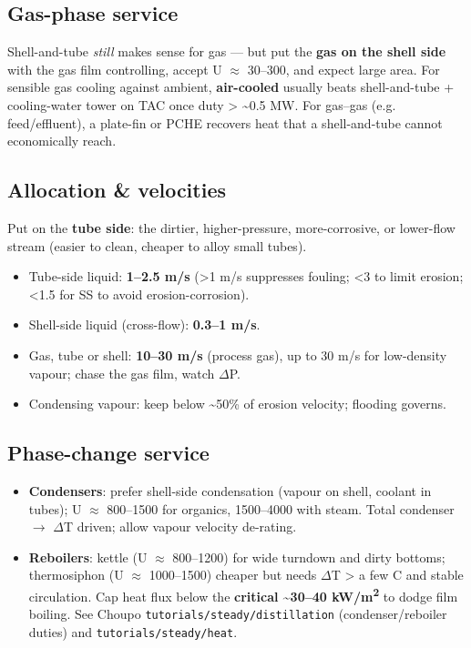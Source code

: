 \documentclass[11pt,a4paper]{article}
\providecommand{\tightlist}{\setlength{\itemsep}{0pt}\setlength{\parskip}{0pt}}
\begin{document}
\hypertarget{gas-phase-service}{%
\subsection{Gas-phase service}\label{gas-phase-service}}

Shell-and-tube \emph{still} makes sense for gas --- but put the
\textbf{gas on the shell side} with the gas film controlling, accept U \(\approx\)
30--300, and expect large area. For sensible gas cooling against
ambient, \textbf{air-cooled} usually beats shell-and-tube +
cooling-water tower on TAC once duty \textgreater{} \textasciitilde0.5
MW. For gas--gas (e.g. feed/effluent), a plate-fin or PCHE recovers heat
that a shell-and-tube cannot economically reach.

\hypertarget{allocation--velocities}{%
\subsection{Allocation \& velocities}\label{allocation--velocities}}

Put on the \textbf{tube side}: the dirtier, higher-pressure,
more-corrosive, or lower-flow stream (easier to clean, cheaper to alloy
small tubes).

\begin{itemize}
\tightlist
\item
  Tube-side liquid: \textbf{1--2.5 m/s} (\textgreater1 m/s suppresses
  fouling; \textless3 to limit erosion; \textless1.5 for SS to avoid
  erosion-corrosion).
\item
  Shell-side liquid (cross-flow): \textbf{0.3--1 m/s}.
\item
  Gas, tube or shell: \textbf{10--30 m/s} (process gas), up to 30 m/s
  for low-density vapour; chase the gas film, watch \(\Delta\)P.
\item
  Condensing vapour: keep below \textasciitilde50\% of erosion velocity;
  flooding governs.
\end{itemize}

\hypertarget{phase-change-service}{%
\subsection{Phase-change service}\label{phase-change-service}}

\begin{itemize}
\tightlist
\item
  \textbf{Condensers}: prefer shell-side condensation (vapour on shell,
  coolant in tubes); U \(\approx\) 800--1500 for organics, 1500--4000 with steam.
  Total condenser \(\rightarrow\) \(\Delta\)T driven; allow vapour velocity de-rating.
\item
  \textbf{Reboilers}: kettle (U \(\approx\) 800--1200) for wide turndown and dirty
  bottoms; thermosiphon (U \(\approx\) 1000--1500) cheaper but needs \(\Delta\)T
  \textgreater{} a few \textdegree{}C and stable circulation. Cap heat flux below
  the \textbf{critical \textasciitilde30--40 kW/m\textsuperscript{2}} to dodge film
  boiling. See Choupo \texttt{tutorials/steady/distillation}
  (condenser/reboiler duties) and
  \texttt{tutorials/steady/heat}.
\end{itemize}
\end{document}
